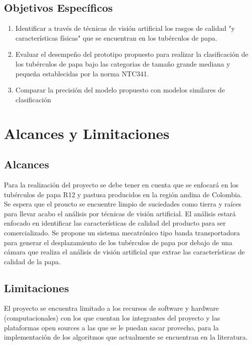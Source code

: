 \subsection{Objetivos Específicos}
\begin{enumerate}
	\item Identificar a través de técnicas de visión artificial los rasgos de calidad "y características físicas" que se encuentran en los tubérculos de papa. 
	\item Evaluar el desempeño del prototipo propuesto para realizar la clasificación de los tubérculos de papa bajo las categorias de tamaño grande mediana y pequeña establecidas por la norma NTC341. 
	\item Comparar la precisión del modelo propuesto con modelos similares de clasificación
\end{enumerate}

\section{Alcances y Limitaciones}

\subsection{Alcances}

Para la realización del proyecto se debe tener en cuenta que se enfocará en los tubérculos de papa R12 y pastusa producidos en la región andina de Colombia. Se espera que el proucto se encuentre limpio de suciedades como tierra y raíces para llevar acabo el análisis por técnicas de visión artificial. El análisis estará enfocado en identificar las características de calidad del producto para ser comercializado. Se propone un sistema mecatrónico tipo banda transportadora para generar el desplazamiento de los tubérculos de papa por debajo de una cámara que realiza el análisis de visión artificial que extrae las características de calidad de la papa.  

\subsection{Limitaciones}


El proyecto se encuentra limitado a los recursos de software y hardware (computacionales) con los que cuentan los integrantes del proyecto y las plataformas open sources a las que se le puedan sacar provecho, para la implementación de los algoritmos que actualmente se encuentran en la literatura.

